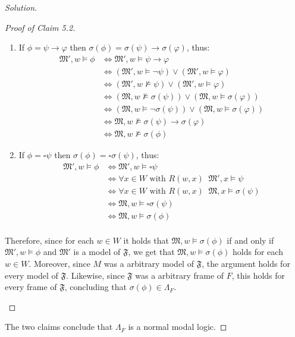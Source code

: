 \documentclass[12pt,a4paper]{report}
\theoremstyle{definition}
\newcommand{\model}[1]{\mathfrak{#1}}           %
\begin{document}
\begin{proof}[Solution]
\begin{proof}[Proof of Claim 5.2]
\begin{itemize}
\begin{enumerate}
                    \item If $\phi = \psi \to \varphi$ then $\sigma(\phi) = \sigma(\psi) \to \sigma(\varphi)$, thus:
                    \[\begin{split}
                        \model{M'}, w \models \phi &\iff \model{M'}, w \models \psi \to \varphi \\
                        & \iff (\model{M'}, w \models \lnot \psi) \lor (\model{M'}, w \models \varphi)\\
                        & \iff (\model{M'}, w \not \models \psi) \lor (\model{M'}, w \models \varphi)\\
                        & \iff (\model{M}, w \not \models \sigma(\psi)) \lor (\model{M}, w \models \sigma(\varphi))\\
                        & \iff (\model{M}, w \models \lnot \sigma(\psi)) \lor (\model{M}, w \models \sigma(\varphi))\\
                        & \iff \model{M}, w \not\models \sigma(\psi) \to \sigma(\varphi) \\
                        & \iff \model{M}, w \not\models \sigma(\phi)
                    \end{split}\]

                    \item If $\phi = \square \psi$ then $\sigma(\phi) = \square \sigma(\psi)$, thus:
                    \[\begin{split}
                        \model{M'}, w \models \phi & \iff \model{M'}, w \models \square \psi \\
                        &\iff \forall x \in W \text{ with } R(w,x) \;\; \model{M'}, x \models \psi \\
                        &\iff \forall x \in W \text{ with } R(w,x) \;\; \model{M}, x \models \sigma(\psi) \\
                        &\iff \model{M}, w \models \square \sigma(\psi) \\
                        &\iff \model{M}, w \models \sigma(\phi) \\
                    \end{split} \]
                \end{enumerate}

                Therefore, since for each $w \in W$ it holds that $\model{M}, w \models \sigma(\phi)$ if and only if $\model{M'}, w \models \phi$ and $\model{M'}$ is a model of $\model{F}$, we get that $\model{M}, w \models \sigma(\phi)$ holds for each $w \in W$. Moreover, since $M$ was a arbitrary model of $\model{F}$, the argument holds for every model of $\model{F}$. Likewise, since $\model{F}$ was a arbitrary frame of $F$, this holds for every frame of $\model{F}$, concluding that $\sigma(\phi) \in \Lambda_{F}$.
            \end{itemize}
        \end{proof}

        The two claims conclude that $\Lambda_{F}$ is a normal modal logic.
    \end{proof}
\end{document}
